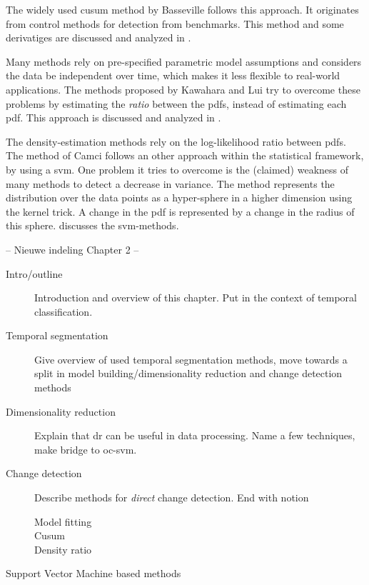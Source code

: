 The widely used \gls{cusum} method by Basseville \etal \cite{basseville1993detection} follows this approach.
It originates from control methods for detection from benchmarks.
This method and some derivatiges are discussed and analyzed in .

Many methods rely on pre-specified parametric model assumptions and considers the data be independent over time, which makes it less flexible to real-world applications.
The methods proposed by Kawahara \etal \cite{kawahara2009change} and Lui \etal \cite{liu2013change} try to overcome these problems by estimating the \emph{ratio} between the \glspl{pdf}, instead of estimating each \gls{pdf}.
This approach is discussed and analyzed in .

The density-estimation methods rely on the log-likelihood ratio between \glspl{pdf}.
The method of Camci \cite{camci2010change} follows an other approach within the statistical framework, by using a \gls{svm}.
One problem it tries to overcome is the (claimed) weakness of many methods to detect a decrease in variance.
The method represents the distribution over the data points as a hyper-sphere in a higher dimension using the kernel trick.
A change in the \gls{pdf} is represented by a change in the radius of this sphere.
 discusses the \gls{svm}-methods.


-- Nieuwe indeling Chapter 2 --

\begin{description}
  \item[Intro/outline] Introduction and overview of this chapter. Put in the context of temporal classification.
  \item[Temporal segmentation] Give overview of used temporal segmentation methods, move towards a split in model building/dimensionality reduction and change detection methods
  \item[Dimensionality reduction] Explain that \gls{dr} can be useful in data processing. Name a few techniques, make bridge to \gls{oc-svm}.
  \item[Change detection] Describe methods for \emph{direct} change detection. End with notion
    \begin{description}
      \item[Model fitting]
      \item[Cusum]
      \item[Density ratio]
    \end{description}
  \item[Support Vector Machine based methods]

\end{description}

